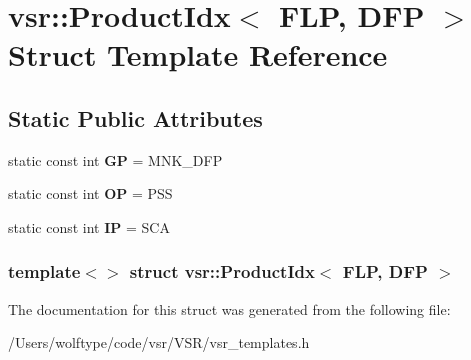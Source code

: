 \hypertarget{structvsr_1_1_product_idx_3_01_f_l_p_00_01_d_f_p_01_4}{\section{vsr\-:\-:Product\-Idx$<$ F\-L\-P, D\-F\-P $>$ Struct Template Reference}
\label{structvsr_1_1_product_idx_3_01_f_l_p_00_01_d_f_p_01_4}
}
\subsection*{Static Public Attributes}
\begin{DoxyCompactItemize}
\item 
\hypertarget{structvsr_1_1_product_idx_3_01_f_l_p_00_01_d_f_p_01_4_a713d1c79b8e42b9d75450aa1ab843624}{static const int {\bfseries G\-P} = M\-N\-K\-\_\-\-D\-F\-P}\label{structvsr_1_1_product_idx_3_01_f_l_p_00_01_d_f_p_01_4_a713d1c79b8e42b9d75450aa1ab843624}

\item 
\hypertarget{structvsr_1_1_product_idx_3_01_f_l_p_00_01_d_f_p_01_4_a1bc33ea31574b7e4a51224e432275e48}{static const int {\bfseries O\-P} = P\-S\-S}\label{structvsr_1_1_product_idx_3_01_f_l_p_00_01_d_f_p_01_4_a1bc33ea31574b7e4a51224e432275e48}

\item 
\hypertarget{structvsr_1_1_product_idx_3_01_f_l_p_00_01_d_f_p_01_4_a13e101d091e08e7d6e48f1759f5f2adf}{static const int {\bfseries I\-P} = S\-C\-A}\label{structvsr_1_1_product_idx_3_01_f_l_p_00_01_d_f_p_01_4_a13e101d091e08e7d6e48f1759f5f2adf}

\end{DoxyCompactItemize}
\subsubsection*{template$<$$>$ struct vsr\-::\-Product\-Idx$<$ F\-L\-P, D\-F\-P $>$}



The documentation for this struct was generated from the following file\-:\begin{DoxyCompactItemize}
\item 
/\-Users/wolftype/code/vsr/\-V\-S\-R/vsr\-\_\-templates.\-h\end{DoxyCompactItemize}
